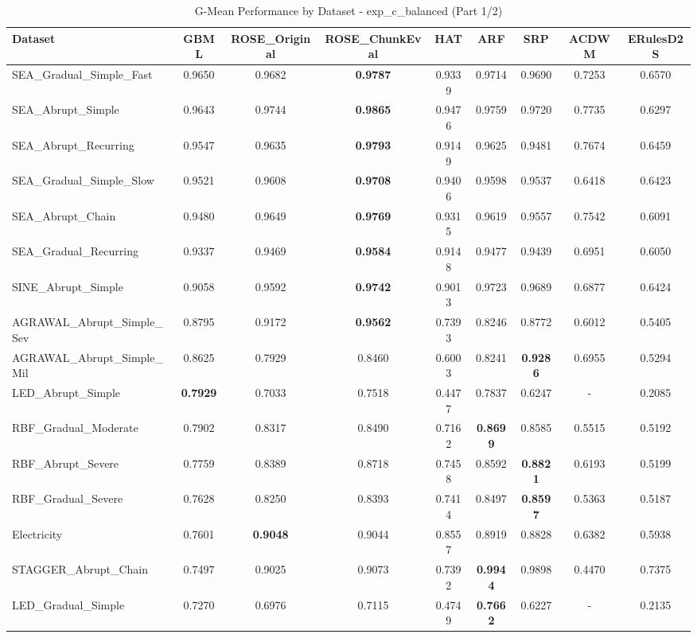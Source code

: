 \begin{table}[htbp]
\centering
\caption{G-Mean Performance by Dataset - exp_c_balanced (Part 1/2)}
\label{tab:gmean_exp_c_balanced_1}
\footnotesize
\begin{tabular}{lcccccccc}
\toprule
Dataset & GBML & ROSE_Original & ROSE_ChunkEval & HAT & ARF & SRP & ACDWM & ERulesD2S \\
\midrule
SEA_Gradual_Simple_Fast & 0.9650 & 0.9682 & \textbf{0.9787} & 0.9339 & 0.9714 & 0.9690 & 0.7253 & 0.6570 \\
SEA_Abrupt_Simple & 0.9643 & 0.9744 & \textbf{0.9865} & 0.9476 & 0.9759 & 0.9720 & 0.7735 & 0.6297 \\
SEA_Abrupt_Recurring & 0.9547 & 0.9635 & \textbf{0.9793} & 0.9149 & 0.9625 & 0.9481 & 0.7674 & 0.6459 \\
SEA_Gradual_Simple_Slow & 0.9521 & 0.9608 & \textbf{0.9708} & 0.9406 & 0.9598 & 0.9537 & 0.6418 & 0.6423 \\
SEA_Abrupt_Chain & 0.9480 & 0.9649 & \textbf{0.9769} & 0.9315 & 0.9619 & 0.9557 & 0.7542 & 0.6091 \\
SEA_Gradual_Recurring & 0.9337 & 0.9469 & \textbf{0.9584} & 0.9148 & 0.9477 & 0.9439 & 0.6951 & 0.6050 \\
SINE_Abrupt_Simple & 0.9058 & 0.9592 & \textbf{0.9742} & 0.9013 & 0.9723 & 0.9689 & 0.6877 & 0.6424 \\
AGRAWAL_Abrupt_Simple_Sev & 0.8795 & 0.9172 & \textbf{0.9562} & 0.7393 & 0.8246 & 0.8772 & 0.6012 & 0.5405 \\
AGRAWAL_Abrupt_Simple_Mil & 0.8625 & 0.7929 & 0.8460 & 0.6003 & 0.8241 & \textbf{0.9286} & 0.6955 & 0.5294 \\
LED_Abrupt_Simple & \textbf{0.7929} & 0.7033 & 0.7518 & 0.4477 & 0.7837 & 0.6247 & - & 0.2085 \\
RBF_Gradual_Moderate & 0.7902 & 0.8317 & 0.8490 & 0.7162 & \textbf{0.8699} & 0.8585 & 0.5515 & 0.5192 \\
RBF_Abrupt_Severe & 0.7759 & 0.8389 & 0.8718 & 0.7458 & 0.8592 & \textbf{0.8821} & 0.6193 & 0.5199 \\
RBF_Gradual_Severe & 0.7628 & 0.8250 & 0.8393 & 0.7414 & 0.8497 & \textbf{0.8597} & 0.5363 & 0.5187 \\
Electricity & 0.7601 & \textbf{0.9048} & 0.9044 & 0.8557 & 0.8919 & 0.8828 & 0.6382 & 0.5938 \\
STAGGER_Abrupt_Chain & 0.7497 & 0.9025 & 0.9073 & 0.7392 & \textbf{0.9944} & 0.9898 & 0.4470 & 0.7375 \\
LED_Gradual_Simple & 0.7270 & 0.6976 & 0.7115 & 0.4749 & \textbf{0.7662} & 0.6227 & - & 0.2135 \\

\end{tabular}
\end{table}
